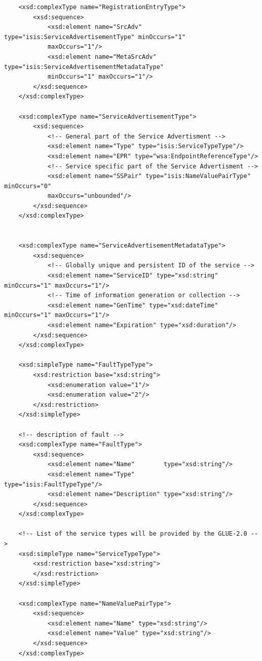\documentclass{book}
\begin{document}
\begin{verbatim}
    <xsd:complexType name="RegistrationEntryType">
        <xsd:sequence>
            <xsd:element name="SrcAdv" type="isis:ServiceAdvertisementType" minOccurs="1" 
            maxOccurs="1"/>
            <xsd:element name="MetaSrcAdv" type="isis:ServiceAdvertisementMetadataType" 
            minOccurs="1" maxOccurs="1"/>
        </xsd:sequence>
    </xsd:complexType>

    <xsd:complexType name="ServiceAdvertisementType">
        <xsd:sequence>
            <!-- General part of the Service Advertisment -->
            <xsd:element name="Type" type="isis:ServiceTypeType"/>
            <xsd:element name="EPR" type="wsa:EndpointReferenceType"/>
            <!-- Service specific part of the Service Advertisment -->
            <xsd:element name="SSPair" type="isis:NameValuePairType" minOccurs="0" 
            maxOccurs="unbounded"/>
        </xsd:sequence>
    </xsd:complexType>


    <xsd:complexType name="ServiceAdvertisementMetadataType">
        <xsd:sequence>
            <!-- Globally unique and persistent ID of the service -->
            <xsd:element name="ServiceID" type="xsd:string" minOccurs="1" maxOccurs="1"/>
            <!-- Time of information generation or collection -->
            <xsd:element name="GenTime" type="xsd:dateTime" minOccurs="1" maxOccurs="1"/>
            <xsd:element name="Expiration" type="xsd:duration"/>
        </xsd:sequence>
    </xsd:complexType>

    <xsd:simpleType name="FaultTypeType">
        <xsd:restriction base="xsd:string">
            <xsd:enumeration value="1"/>
            <xsd:enumeration value="2"/>
        </xsd:restriction>
    </xsd:simpleType>

    <!-- description of fault -->
    <xsd:complexType name="FaultType">
        <xsd:sequence>
            <xsd:element name="Name"        type="xsd:string"/>
            <xsd:element name="Type"        type="isis:FaultTypeType"/>
            <xsd:element name="Description" type="xsd:string"/>
        </xsd:sequence>
    </xsd:complexType>

    <!-- List of the service types will be provided by the GLUE-2.0 -->
    <xsd:simpleType name="ServiceTypeType">
        <xsd:restriction base="xsd:string">
        </xsd:restriction>
    </xsd:simpleType>

    <xsd:complexType name="NameValuePairType">
        <xsd:sequence>
            <xsd:element name="Name" type="xsd:string"/>
            <xsd:element name="Value" type="xsd:string"/>
        </xsd:sequence>
    </xsd:complexType>


\end{verbatim}
\end{document}
